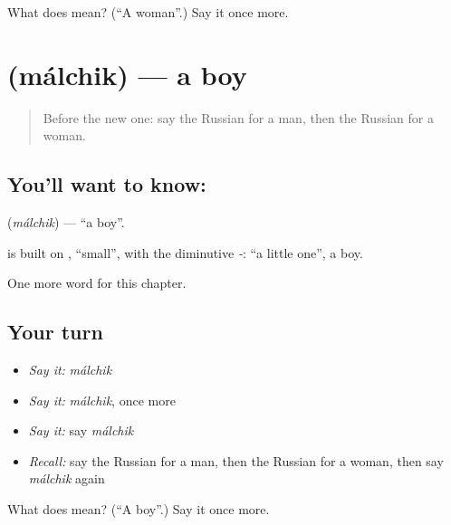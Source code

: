\begin{tcolorbox}[breakable,colback=teal!4,colframe=teal!35!black,title={Before you move on}]
What does  mean? (\textquotedblleft{}A woman\textquotedblright{}.) Say it once more.
\end{tcolorbox}
\section[\texorpdfstring{\ru{мальчик} (málchik)}{мальчик (málchik)}]{ (málchik) — a boy}

\label{lesson:RU-C227-malchik}



\begin{quote}
Before the new one: say the Russian for a man, then the Russian for a woman.
\end{quote}

\subsection*{You'll want to know: }
\textbf{} (\emph{málchik}) — \textquotedblleft{}a boy\textquotedblright{}.

\begin{cousinweb}
\textbf{} is built on \emph{}, \textquotedblleft{}small\textquotedblright{}, with the diminutive \emph{-}: \textquotedblleft{}a little one\textquotedblright{}, a boy.
\end{cousinweb}

\begin{grammarlens}[title={What you've built}]
One more word for this chapter.
\end{grammarlens}

\subsection*{Your turn}
\begin{itemize}
\raggedright
  \item \emph{Say it:} \emph{málchik}
  \item \emph{Say it:} \emph{málchik}, once more
  \item \emph{Say it:} say \emph{málchik}
  \item \emph{Recall:} say the Russian for a man, then the Russian for a woman, then say \emph{málchik} again
\end{itemize}

\begin{tcolorbox}[breakable,colback=teal!4,colframe=teal!35!black,title={Before you move on}]
What does  mean? (\textquotedblleft{}A boy\textquotedblright{}.) Say it once more.
\end{tcolorbox}
